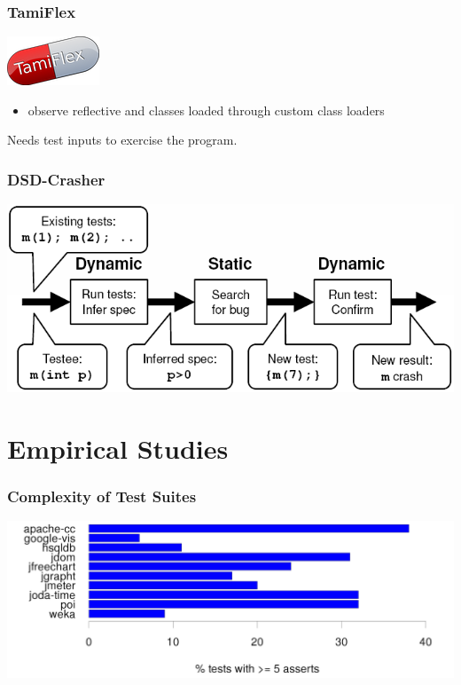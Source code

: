 \documentclass{beamer}
\begin{document}
\begin{frame}
  \frametitle{TamiFlex}

\begin{center}
\includegraphics[width=.2\textwidth]{images/tamiflex.png}
\end{center}


\begin{itemize}
\item observe reflective and classes loaded through custom class loaders
\end{itemize}

Needs test inputs to exercise the program.
\end{frame}

\begin{frame}
  \frametitle{DSD-Crasher}

\begin{center}
\includegraphics[width=\textwidth]{images/dsd.png}
\end{center}
\end{frame}

\section{Empirical Studies}

\begin{frame}
  \frametitle{Complexity of Test Suites}
\begin{center}
\includegraphics[width=\textwidth, height=.8\textheight, keepaspectratio=true]{images/five-asserts.png}
\end{center}
\end{frame}
\end{document}
